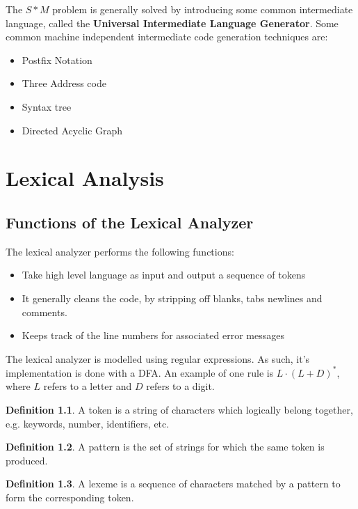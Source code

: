 \documentclass[12pt,letterpaper]{book}
\theoremstyle{definition}
\newtheorem{definition}{Definition}[section] %
\begin{document}
The $S*M$ problem is generally solved by introducing some common intermediate language, called the \textbf{Universal Intermediate Language Generator}. Some common machine independent intermediate code generation techniques are:

\begin{itemize}
  \item Postfix Notation
  \item Three Address code
  \item Syntax tree
  \item Directed Acyclic Graph
\end{itemize}


\chapter{Lexical Analysis}

\section{Functions of the Lexical Analyzer}

The lexical analyzer performs the following functions:

\begin{itemize}
  \item Take high level language as input and output a sequence of tokens
  \item It generally cleans the code, by stripping off blanks, tabs newlines and comments.
  \item Keeps track of the line numbers for associated error messages
\end{itemize}

The lexical analyzer is modelled using regular expressions. As such, it's implementation is done with a DFA. An example of one rule is $L \cdot (L+D)^*$, where $L$ refers to a letter and $D$ refers to a digit.

\begin{definition}
  A token is a string of characters which logically belong together, e.g. keywords, number, identifiers, etc.
\end{definition}

\begin{definition}
  A pattern is the set of strings for which the same token is produced.
\end{definition}

\begin{definition}
  A lexeme is a sequence of characters matched by a pattern to form the corresponding token.
\end{definition}
\end{document}
